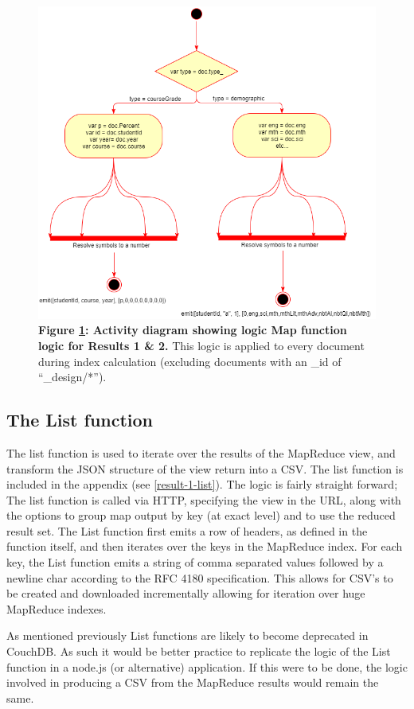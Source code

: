 \begin{figure}[ht]
    \centering
    \begin{mdframed}
        \centering
        \includegraphics[scale=0.35]{./resources/figures/activity-diagram-1.png}
    \end{mdframed}
    \caption[Result 1 Map function]{\textbf{Figure \ref{result-1-map-fn}: Activity diagram showing logic Map function logic for Results 1 \& 2.} This logic is applied to every document during index calculation (excluding documents with an \_id of ``\_design/*'').}
    \label{result-1-map-fn}
\end{figure}

\subsection*{The List function}
The list function is used to iterate over the results of the MapReduce view, and transform the JSON structure of the view return into a CSV. The list function is included in the appendix (see \ref{result-1-list}). The logic is fairly straight forward; The list function is called via HTTP, specifying the view in the URL, along with the options to group map output by key (at exact level) and to use the reduced result set. The List function first emits a row of headers, as defined in the function itself, and then iterates over the keys in the MapReduce index. For each key, the List function emits a string of comma separated values followed by a newline char according to the RFC 4180 specification. This allows for CSV's to be created and downloaded incrementally allowing for iteration over huge MapReduce indexes.

As mentioned previously List functions are likely to become deprecated in CouchDB. As such it would be better practice to replicate the logic of the List function in a node.js (or alternative) application. If this were to be done, the logic involved in producing a CSV from the MapReduce results would remain the same.
